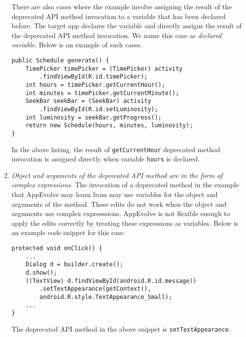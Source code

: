 \begin{enumerate}
There are also cases where the example involve assigning the result of the deprecated API method invocation to a variable that has been declared before. The target app declares the variable and directly assigns the result of the deprecated API method invocation. We name this case as {\em declared variable}. Below is an example of such cases.
\begin{lstlisting}[language=text,numbers=none,caption=The result of a deprecated method is assigned directly to a variable,captionpos=b, label=lst:indirectassign]
public Schedule generate() {
    TimePicker timePicker = (TimePicker) activity
        .findViewById(R.id.timePicker);
    int hours = timePicker.getCurrentHour();
    int minutes = timePicker.getCurrentMinute();
    SeekBar seekBar = (SeekBar) activity
        .findViewById(R.id.setLuminosity);
    int luminosity = seekBar.getProgress();
    return new Schedule(hours, minutes, luminosity);
}
\end{lstlisting}
In the above listing, the result of {\tt getCurrentHour} deprecated method invocation is assigned directly when variable {\tt hours} is declared. 

\item {\em Object and arguments of the deprecated API method are in the form of complex expressions.} The invocation of a deprecated method in the example that AppEvolve may learn from may use variables for the object and arguments of the method. These edits do not work when the object and arguments use complex expresssions. AppEvolve is not flexible enough to apply the edits correctly by treating these expressions as variables. Below is an example code snippet for this case.
\begin{lstlisting}[language=text,numbers=none,caption=Complex expressions representing an object that is calling the deprecated method,captionpos=b, label=lst:complexexpress]
protected void onClick() {
    ...
    Dialog d = builder.create();
    d.show();
    ((TextView) d.findViewById(android.R.id.message))
        .setTextAppearance(getContext(), 
        android.R.style.TextAppearance_Small);
    ...
}
\end{lstlisting}
The deprecated API method in the above snippet is {\tt setTextAppearance}.


\end{enumerate}
